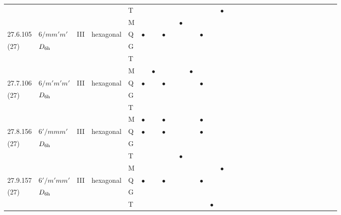 \documentclass[fleqn,9pt,landscape]{jsarticle}
\begin{document}
\begin{longtable}{lllll|l|l|l|l|l|l|l|l|l|ll|ll|ll|ll|ll|ll|ll|ll}
 &  &  &  & T &  &  &  &  &  &  &  &  & $\bullet$ &  &  &  &  &  &  &  &  &  &  &  &  &  &  &  &  \\
 &  &  &  & M &  &  &  &  & $\bullet$ &  &  &  &  &  &  &  &  &  &  &  &  &  &  &  &  &  &  &  &  \\ \hline
27.6.105 & \texttt{$6/mm'm'$} & III & hexagonal & Q & $\bullet$ &  & $\bullet$ &  &  &  & $\bullet$ &  &  &  &  &  &  &  &  &  &  &  &  &  &  &  &  &  &  \\
(27) & $D_{\rm 6h}$ &  &  & G &  &  &  &  &  &  &  &  &  &  &  &  &  &  &  &  &  &  &  &  &  &  &  &  &  \\
 &  &  &  & T &  &  &  &  &  &  &  &  &  &  &  &  &  &  &  &  &  &  &  &  &  &  &  &  &  \\
 &  &  &  & M &  & $\bullet$ &  &  &  & $\bullet$ &  &  &  &  &  &  &  &  &  &  &  &  &  &  &  &  &  &  &  \\ \hline
27.7.106 & \texttt{$6/m'm'm'$} & III & hexagonal & Q & $\bullet$ &  & $\bullet$ &  &  &  & $\bullet$ &  &  &  &  &  &  &  &  &  &  &  &  &  &  &  &  &  &  \\
(27) & $D_{\rm 6h}$ &  &  & G &  &  &  &  &  &  &  &  &  &  &  &  &  &  &  &  &  &  &  &  &  &  &  &  &  \\
 &  &  &  & T &  &  &  &  &  &  &  &  &  &  &  &  &  &  &  &  &  &  &  &  &  &  &  &  &  \\
 &  &  &  & M & $\bullet$ &  & $\bullet$ &  &  &  & $\bullet$ &  &  &  &  &  &  &  &  &  &  &  &  &  &  &  &  &  &  \\ \hline
27.8.156 & \texttt{$6'/mmm'$} & III & hexagonal & Q & $\bullet$ &  & $\bullet$ &  &  &  & $\bullet$ &  &  &  &  &  &  &  &  &  &  &  &  &  &  &  &  &  &  \\
(27) & $D_{\rm 6h}$ &  &  & G &  &  &  &  &  &  &  &  &  &  &  &  &  &  &  &  &  &  &  &  &  &  &  &  &  \\
 &  &  &  & T &  &  &  &  & $\bullet$ &  &  &  &  &  &  &  &  &  &  &  &  &  &  &  &  &  &  &  &  \\
 &  &  &  & M &  &  &  &  &  &  &  &  & $\bullet$ &  &  &  &  &  &  &  &  &  &  &  &  &  &  &  &  \\ \hline
27.9.157 & \texttt{$6'/m'mm'$} & III & hexagonal & Q & $\bullet$ &  & $\bullet$ &  &  &  & $\bullet$ &  &  &  &  &  &  &  &  &  &  &  &  &  &  &  &  &  &  \\
(27) & $D_{\rm 6h}$ &  &  & G &  &  &  &  &  &  &  &  &  &  &  &  &  &  &  &  &  &  &  &  &  &  &  &  &  \\
 &  &  &  & T &  &  &  &  &  &  &  & $\bullet$ &  &  &  &  &  &  &  &  &  &  &  &  &  &  &  &  &  \\

\end{longtable}
\end{document}
